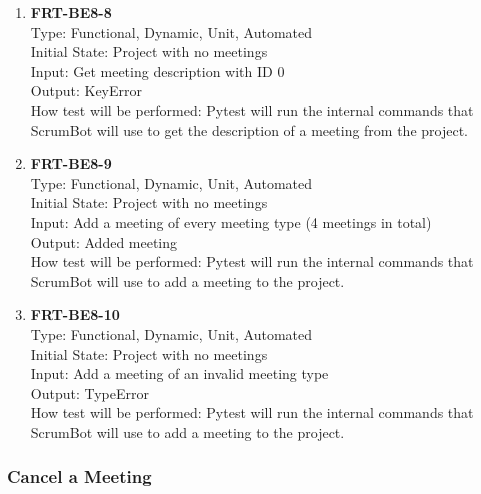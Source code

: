 \documentclass[12pt, titlepage]{article}
\begin{document}
\begin{enumerate}
    \item{\textbf{FRT-BE8-8}}\\
    Type: Functional, Dynamic, Unit, Automated\\
    Initial State: Project with no meetings\\
    Input: Get meeting description with ID 0\\
    Output: KeyError\\
    How test will be performed: Pytest will run the internal commands that ScrumBot will use to get the description of a meeting from the project.
    
    \item{\textbf{FRT-BE8-9}}\\
    Type: Functional, Dynamic, Unit, Automated\\
    Initial State: Project with no meetings\\
    Input: Add a meeting of every meeting type (4 meetings in total)\\
    Output: Added meeting\\
    How test will be performed: Pytest will run the internal commands that ScrumBot will use to add a meeting to the project.
    
    \item{\textbf{FRT-BE8-10}}\\
    Type: Functional, Dynamic, Unit, Automated\\
    Initial State: Project with no meetings\\
    Input: Add a meeting of an invalid meeting type\\
    Output: TypeError\\
    How test will be performed: Pytest will run the internal commands that ScrumBot will use to add a meeting to the project.
\end{enumerate}

\subsubsection{Cancel a Meeting}
\end{document}
